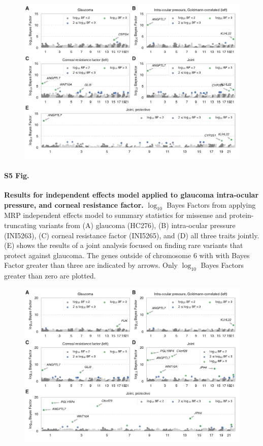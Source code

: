 \begin{figure}[H]
\includegraphics[width=\textwidth]{../figures/final/Figure_S05.pdf}
\end{figure}
\paragraph*{S5 Fig.}
\label{glaucoma_independent}
{\bf Results for independent effects model applied to glaucoma intra-ocular pressure, and corneal resistance factor.} $\log_{10}$ Bayes Factors from applying MRP independent effects model to summary statistics for missense and protein-truncating variants from (A) glaucoma (HC276), (B) intra-ocular pressure (INI5263), (C) corneal resistance factor (INI5265), and (D) all three traits jointly. (E) shows the results of a joint analysis focused on finding rare variants that protect against glaucoma. The genes outside of chromosome 6 with with Bayes Factor greater than three are indicated by arrows. Only $\log_{10}$ Bayes Factors greater than zero are plotted.

\begin{figure}[H]
\includegraphics[width=\textwidth]{../figures/final/Figure_S06.pdf}
\end{figure}
